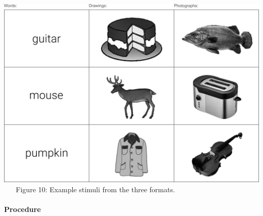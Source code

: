 \documentclass[
  11pt,
]{article}
\begin{document}
~ ~

\includegraphics[width=1\linewidth]{./resources/images/exp3__stim_examples}
~ ~ Figure 10: Example stimuli from the three formats. ~ ~

\hypertarget{procedure-2}{%
\paragraph{Procedure}\label{procedure-2}}
\end{document}
